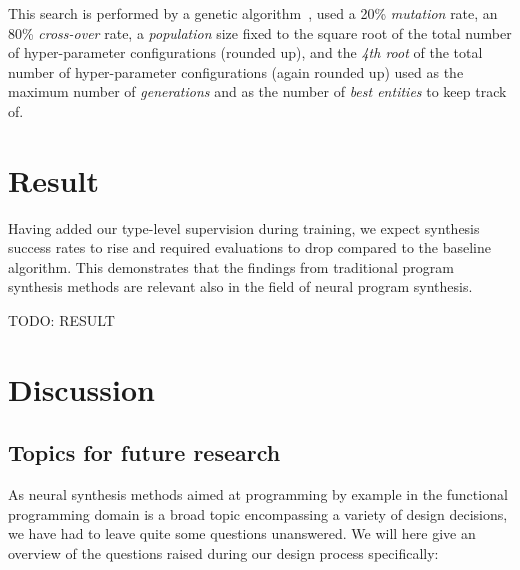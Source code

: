 \documentclass{article}
\begin{document}
This search is performed by a genetic algorithm~\citep{koza1994genetic},
used a 20\% \emph{mutation} rate,
an 80\% \emph{cross-over} rate,
a \emph{population} size fixed to the square root of the total number of hyper-parameter configurations (rounded up),
and the \emph{4th root} of the total number of hyper-parameter configurations (again rounded up)
used as the maximum number of \emph{generations} and as the number of \emph{best entities} to keep track of.


\section{Result} %

Having added our type-level supervision during training, we expect synthesis success rates to rise and required evaluations to drop compared to the baseline algorithm.
This demonstrates that the findings from traditional program synthesis methods are relevant also in the field of neural program synthesis.

  TODO: RESULT


\section{Discussion} %


\subsection{Topics for future research}

As neural synthesis methods aimed at programming by example in the functional
programming domain is a broad topic encompassing a variety of design decisions,
we have had to leave quite some questions unanswered.
We will here give an overview of the questions raised during our design process specifically:
\end{document}
